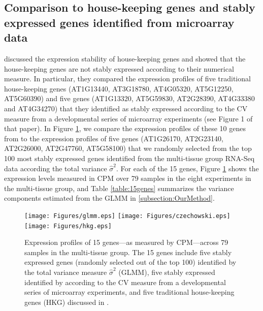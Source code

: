 \documentclass[letterpaper,12pt]{article}
\begin{document}
\subsection{Comparison to house-keeping genes and stably expressed genes
identified from microarray data}\label{section:CompareStablyExpressedGene}
\cite{czechowski2005genome} discussed the expression stability of
house-keeping genes and showed that the house-keeping genes are not stably
expressed according to their numerical measure. In particular, they compared
the expression profiles of five traditional house-keeping genes (AT1G13440,
AT3G18780, AT4G05320, AT5G12250, AT5G60390) and five genes (AT1G13320,
AT5G59830, AT2G28390, AT4G33380 and AT4G34270) that they identified  as stably
expressed according to the CV measure from a developmental series of
microarray experiments (see Figure 1 of that paper).  
In Figure \ref{expressionlevel1}, we compare the expression profiles 
of these 10 genes from \cite{czechowski2005genome} to the expression profiles
of five genes (AT1G26170, AT2G23140, AT2G26000, AT2G47760, AT5G58100) that we
randomly selected from the top 100 most stably expressed genes identified from
the multi-tissue group RNA-Seq data according the total variance $\hat\sigma^2$.
For each of the 15 genes, Figure \ref{expressionlevel1} shows the expression levels measured
in CPM over 79 samples in the eight experiments in the multi-tissue group,
and Table \ref{table:15genes} summarizes the variance components estimated from the
GLMM in \ref{subsection:OurMethod}. 

\begin{figure}[htbp]
    \begin{center}
	\texttt{[image: Figures/glmm.eps]}
	\texttt{[image: Figures/czechowski.eps]}
	\texttt{[image: Figures/hkg.eps]}
	\caption{Expression profiles of 15 genes---as measured by CPM---across 79
	samples in the multi-tissue group. The 15 genes include 
	five stably expressed genes (randomly selected out of the top 100)
	identified by the total variance measure $\hat{\sigma}^2$ (GLMM), five stably
	expressed identified by \citet{czechowski2005genome} according to the CV measure from a
	developmental series of microarray experiments, and five
	traditional house-keeping genes (HKG) discussed in
	\citet{czechowski2005genome}. 
	}
	\label{expressionlevel1}
    \end{center}
\end{figure} 
\end{document}
